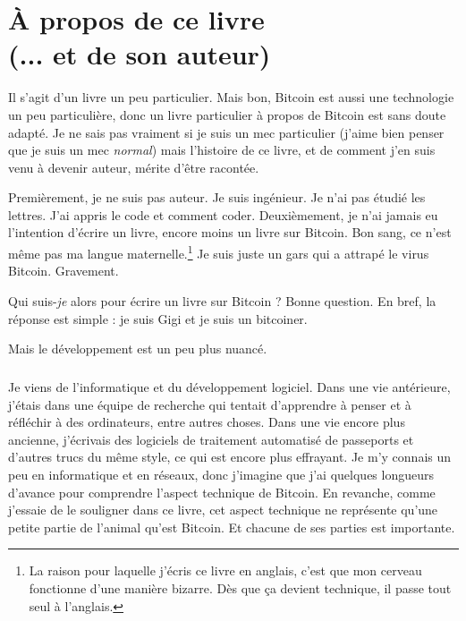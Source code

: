 
\def\bitcoinB{\leavevmode
  {\setbox0=\hbox{\textsf{B}}%
    \dimen0\ht0 \advance\dimen0 0.2ex
    \ooalign{\hfil \box0\hfil\cr
      \hfil\vrule height \dimen0 depth.2ex\hfil\cr
    }%
  }%
}

\chapter*{À propos de ce livre \\ (... et de son auteur)}

Il s'agit d'un livre un peu particulier. Mais bon, Bitcoin est aussi une
technologie un peu particulière, donc un livre particulier à propos de Bitcoin
est sans doute adapté. Je ne sais pas vraiment si je suis un mec particulier
(j'aime bien penser que je suis un mec \textit{normal}) mais l'histoire de ce
livre, et de comment j'en suis venu à devenir auteur, mérite d'être racontée.

Premièrement, je ne suis pas auteur. Je suis ingénieur. Je n'ai pas étudié
les lettres. J'ai appris le code et comment coder. Deuxièmement, je n'ai jamais
eu l'intention d'écrire un livre, encore moins un livre sur Bitcoin. Bon sang,
ce n'est même pas ma langue maternelle.\footnote{La raison pour laquelle
j'écris ce livre en anglais, c'est que mon cerveau fonctionne d'une manière
bizarre. Dès que ça devient technique, il passe tout seul à l'anglais.} Je suis
juste un gars qui a attrapé le virus Bitcoin. Gravement.

Qui suis-\textit{je} alors pour écrire un livre sur Bitcoin ? Bonne question. En
bref, la réponse est simple : je suis Gigi et je suis un bitcoiner.

Mais le développement est un peu plus nuancé.

\paragraph{}
Je viens de l'informatique et du développement logiciel. Dans une vie
antérieure, j'étais dans une équipe de recherche qui tentait d'apprendre à
penser et à réfléchir à des ordinateurs, entre autres choses. Dans une vie
encore plus ancienne, j'écrivais des logiciels de traitement automatisé de
passeports et d'autres trucs du même style, ce qui est encore plus effrayant. Je
m'y connais un peu en informatique et en réseaux, donc j'imagine que j'ai
quelques longueurs d'avance pour comprendre l'aspect technique de Bitcoin. En
revanche, comme j'essaie de le souligner dans ce livre, cet aspect technique ne
représente qu'une petite partie de l'animal qu'est Bitcoin. Et chacune de ses
parties est importante.

